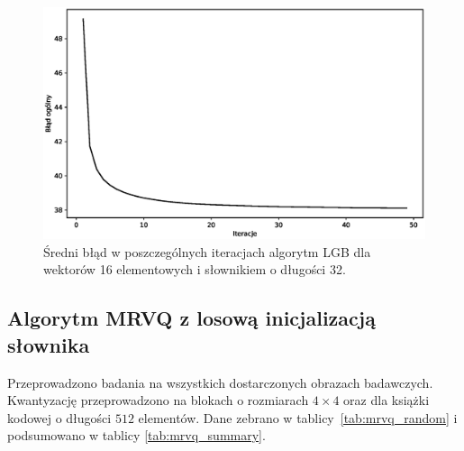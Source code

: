 \documentclass{article}
\begin{document}
\begin{figure}[H]
  \centering
  \includegraphics[width=.9\linewidth]{images/lbg_4x4_32_mean_iterations.eps}  
  \caption{Średni błąd w poszczególnych iteracjach algorytm LGB dla wektorów 16 elementowych i słownikiem o długości 32.}
  \label{fig:lbg_iterations_mean}
\end{figure}

\subsection{Algorytm MRVQ z losową inicjalizacją słownika}

Przeprowadzono badania na wszystkich dostarczonych obrazach badawczych. Kwantyzację przeprowadzono na blokach o rozmiarach $4 \times 4$ oraz dla książki
kodowej o długości $512$ elementów. Dane zebrano w \mbox{tablicy \ref{tab:mrvq_random}} i podsumowano w tablicy \mbox{\ref{tab:mrvq_summary}}.
\end{document}
